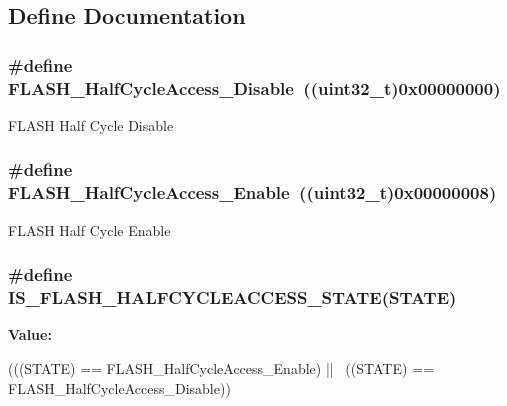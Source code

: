 \subsection{Define Documentation}
\hypertarget{group__Half__Cycle__Enable__Disable_gad1ec816fa04b9a45e51c1cc9f1ba8f42}{
\subsubsection[{FLASH\_\-HalfCycleAccess\_\-Disable}]{\setlength{\rightskip}{0pt plus 5cm}\#define FLASH\_\-HalfCycleAccess\_\-Disable~((uint32\_\-t)0x00000000)}}
\label{group__Half__Cycle__Enable__Disable_gad1ec816fa04b9a45e51c1cc9f1ba8f42}
FLASH Half Cycle Disable \hypertarget{group__Half__Cycle__Enable__Disable_ga95adf58ccf48094a9648085ac8d8af13}{
\subsubsection[{FLASH\_\-HalfCycleAccess\_\-Enable}]{\setlength{\rightskip}{0pt plus 5cm}\#define FLASH\_\-HalfCycleAccess\_\-Enable~((uint32\_\-t)0x00000008)}}
\label{group__Half__Cycle__Enable__Disable_ga95adf58ccf48094a9648085ac8d8af13}
FLASH Half Cycle Enable \hypertarget{group__Half__Cycle__Enable__Disable_gad1b9e84a20436dcfe1a1ade4c26dc028}{
\subsubsection[{IS\_\-FLASH\_\-HALFCYCLEACCESS\_\-STATE}]{\setlength{\rightskip}{0pt plus 5cm}\#define IS\_\-FLASH\_\-HALFCYCLEACCESS\_\-STATE(STATE)}}
\label{group__Half__Cycle__Enable__Disable_gad1b9e84a20436dcfe1a1ade4c26dc028}
{\bfseries Value:}
\begin{DoxyCode}
(((STATE) == FLASH_HalfCycleAccess_Enable) || \
                                               ((STATE) == 
      FLASH_HalfCycleAccess_Disable))
\end{DoxyCode}
